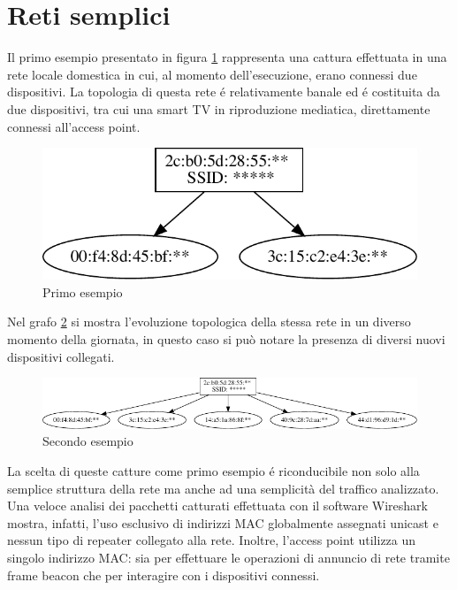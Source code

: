 \section{Reti semplici}

Il primo esempio presentato in figura \ref{fig:es1} rappresenta una cattura effettuata in una rete locale domestica in cui, al momento dell'esecuzione, erano connessi due dispositivi.
La topologia di questa rete \'e relativamente banale ed \'e costituita da due dispositivi, tra cui una smart TV in riproduzione mediatica, direttamente connessi all'access point.

\begin{figure}[!h]
	\centering
	\includegraphics{images/img8censored.pdf}
	\caption{Primo esempio}
	\label{fig:es1}
\end{figure}


Nel grafo \ref{fig:es2} si mostra l'evoluzione topologica della stessa rete in un diverso momento della giornata, in questo caso si pu\`o notare la presenza di diversi nuovi dispositivi collegati.
\begin{figure}[!h]
	\centering
	\includegraphics{images/img9censored.pdf}
	\caption{Secondo esempio}
	\label{fig:es2}
\end{figure}

La scelta di queste catture come primo esempio \'e riconducibile non solo alla semplice struttura della rete ma anche ad una semplicit\`a del traffico analizzato.
Una veloce analisi dei pacchetti catturati effettuata con il software Wireshark mostra, infatti, l'uso esclusivo di indirizzi MAC globalmente assegnati unicast e nessun tipo di repeater collegato alla rete.
Inoltre, l'access point utilizza un singolo indirizzo MAC: sia per effettuare le operazioni di annuncio di rete tramite frame beacon che per interagire con i dispositivi connessi.

